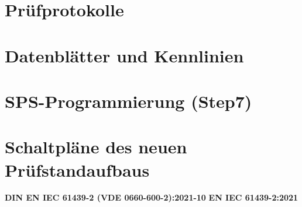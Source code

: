 



\section{Prüfprotokolle}
\label{chap:anhang_pruefprotokolle}

\clearpage

\section{Datenblätter und Kennlinien}
\label{chap:anhang_datenblaetter}

\clearpage

\section{SPS-Programmierung (Step7)}
\label{chap:anhang_programm}

\clearpage

\section{Schaltpläne des neuen Prüfstandaufbaus}
\label{chap:anhang_schaltplaene}

\noindent
\textbf{DIN EN IEC 61439-2 (VDE 0660-600-2):2021-10} \newline
\textbf{EN IEC 61439-2:2021}

\vspace{1em}

